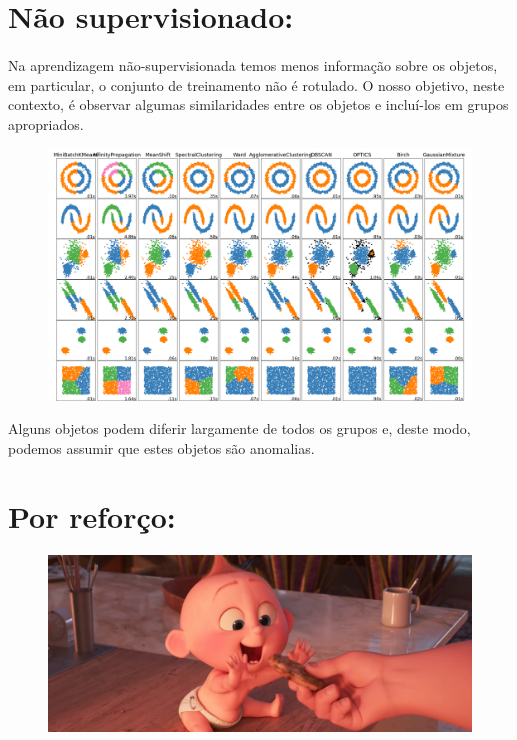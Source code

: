 \documentclass{article}
\begin{document}
           \section*{\centering Não supervisionado:}
        
            \paragraph{}Na aprendizagem não-supervisionada temos menos informação sobre os objetos, em particular, o conjunto de treinamento não é rotulado. O nosso objetivo, neste contexto, é observar algumas similaridades entre os objetos e incluí-los em grupos apropriados. 
                
            \begin{figure}[ht]
            \label{fig:classificação}
            \centering
            \includegraphics[scale=0.3]{classificação de grupos.png}               
            \end{figure}
            Alguns objetos podem diferir largamente de todos os grupos e, deste modo, podemos assumir que estes objetos são anomalias.
           
           \clearpage
           \section*{\centering Por reforço:}
           \begin{figure}[ht]
           \centering
           \includegraphics[scale=0.2]{jack-jack-num-num-cookie_orig.png}
           \end{figure}
   
\end{document}
